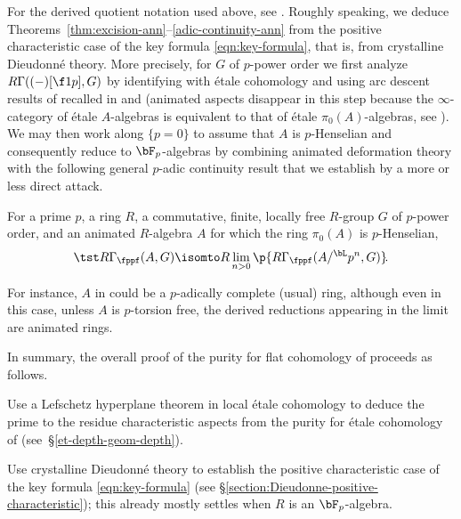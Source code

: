 
For the derived quotient notation used above, see \uS{}.
Roughly speaking, we deduce Theorems~\ref{thm:excision-ann}--\ref{adic-continuity-ann} from the positive characteristic case of the key formula \eqref{eqn:key-formula}, that is, from crystalline Dieudonn\'{e} theory. More precisely, for $G$ of $p$-power order we first analyze $R\Gamma((-)[\f 1p], G)$ by identifying with \'{e}tale cohomology and using arc descent results of \cite{BM20} recalled in  and  (animated aspects disappear in this step because the $\infty$-category of \'{e}tale $A$-algebras is equivalent to that of \'{e}tale $\pi_0(A)$-algebras, see ). We may then work along $\{p = 0\}$ to assume that $A$ is $p$-Henselian and consequently reduce to $\bF_p$-algebras by combining animated deformation theory with the following general $p$-adic continuity result that we establish by a more or less direct attack.

 \label{thm:p-adic-continuity-ann}
For a prime $p$, a ring $R$, a commutative, finite, locally free $R$-group $G$ of $p$-power order, and an animated $R$-algebra $A$ for which the ring $\pi_0(A)$ is $p$-Henselian,
\[
\tst R\Gamma_\fppf(A, G) \isomto R\lim_{n > 0}\p{R\Gamma_\fppf(A/^\bL p^n, G)}\!.
\]
\ethm

For instance, $A$ in  could be a $p$-adically complete (usual) ring, although even in this case, unless $A$ is $p$-torsion free, the derived reductions appearing in the limit are animated rings.





In summary, the overall proof of the purity for flat cohomology of  proceeds as follows.

\benuma
\m
Use a Lefschetz hyperplane theorem in local \'{e}tale cohomology to deduce the prime to the residue characteristic aspects from the purity for \'{e}tale cohomology of 
(see~\S\ref{et-depth-geom-depth}).

\m
Use crystalline Dieudonn\'{e} theory to establish the positive characteristic case of the key formula \eqref{eqn:key-formula} %
(see \S\ref{section:Dieudonne-positive-characteristic}); this already mostly settles  when $R$ is an $\bF_p$-algebra.%

